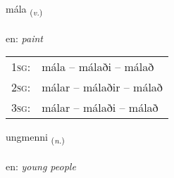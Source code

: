 \documentclass[frontgrid, backgrid]{flacards}\usepackage[]{graphicx}\usepackage[]{xcolor}
\begin{document}
\renewcommand{\flhead}{\vskip5pt \fboxsep=0pt {\small\bfseries\footnotesize Sagnorð | Verb}}
\renewcommand{\fcfoot}{\vskip5pt \fboxsep=0pt \hspace{2pt}{\small\bfseries\footnotesize 3K}}

\renewcommand{\blhead}{\vskip5pt {\small\bfseries\footnotesize Sagnorð | Verb }}
\renewcommand{\bcfoot}{\vskip5pt \hspace{2pt}{\small\bfseries\footnotesize 3K}}


{mála \small{\textsubscript{(\textit{v.})}} \\[1ex] %
\textphonetic{[mauːla]} \\
en: \emph{paint} \\  [2ex]
\renewcommand*{\arraystretch}{0.8}
\begin{tabular}{p{1cm}l}
\textsc{1sg}: & mála -- málaði -- málað \\ 
\textsc{2sg}: & málar -- málaðir -- málað \\ 
\textsc{3sg}: & málar -- málaði -- málað \\ 
\end{tabular}
}

\renewcommand{\flhead}{\vskip5pt \fboxsep=0pt {\small\bfseries\footnotesize Nafnorð | Noun}}
\renewcommand{\fcfoot}{\vskip5pt \fboxsep=0pt \hspace{2pt}{\small\bfseries\footnotesize 3K}}

\renewcommand{\blhead}{\vskip5pt {\small\bfseries\footnotesize Nafnorð | Noun }}
\renewcommand{\bcfoot}{\vskip5pt \hspace{2pt}{\small\bfseries\footnotesize 3K}}


{ungmenni \small{\textsubscript{(\textit{n.})}} \\[1ex] %
\textphonetic{[uŋkmɛnɪ]} \\
en: \emph{young people} \\  [2ex]
\renewcommand*{\arraystretch}{0.8}
}
\end{document}
